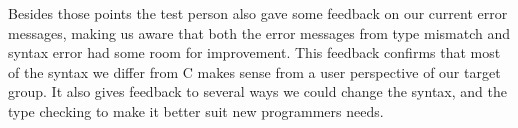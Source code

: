 Besides those points the test person also gave some feedback on our current error messages, making us aware that both the error messages from type mismatch and syntax error had some room for improvement.
This feedback confirms that most of the syntax we differ from C makes sense from a user perspective of our target group. It also gives feedback to several ways we could change the syntax, and the type checking to make it better suit new programmers needs.  









